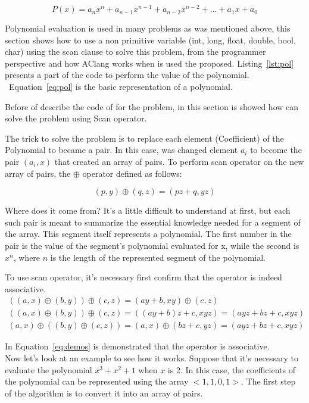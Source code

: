 \documentclass[Ingles]{ic-tese-v1}
\newcommand{\req}[1]{Equation~\ref{eq:#1}}
\newcommand{\rlst}[1]{Listing~\ref{lst:#1}}
\begin{document}
\begin{equation}
P(x) = a_{n}x^n + a_{n-1}x^{n-1} + a_{n-2}x^{n-2} + ... + a_{1}x + a_{0}
\label{eq:pol}
\end{equation}

Polynomial evaluation is used in many problems as was mentioned above, this
section shows how to use a non primitive variable (int, long, float, double, bool, char)
using the scan clause to solve this problem, from the programmer perspective
and how AClang works when is used the proposed. \rlst{pol} presents 
a part of the code to perform the value of the polynomial. ~\req{pol} is the basic
representation of a polynomial.

Before of describe the code of for the problem, in this section is
showed how can solve the problem using Scan operator.

The trick to solve the problem is to replace each element (Coefficient) of the Polynomial to became a pair. In this case, was changed element $a_{i}$ to become the pair $(a_{i}, x)$ that
created an array of pairs. To perform scan operator on the new array of pairs, the $\oplus$ operator defined as follows:

\begin{equation}
(p, y) \oplus (q, z) = (p z + q, y z)
\label{eq:opepol}
\end{equation}

Where does it come from? It's a little difficult to understand at first, but
each such pair is meant to summarize the essential knowledge needed for a
segment of the array. This segment itself represents a polynomial. The first
number in the pair is the value of the segment's polynomial evaluated for x,
while the second is $x^{n}$, where $n$ is the length of the represented segment 
of the polynomial.

To use scan operator, it's necessary first confirm that the operator is indeed associative.
\begin{equation}
\begin{split}
((a, x) \oplus (b, y)) \oplus (c, z) = (a y + b, x y) \oplus (c, z) \\
((a, x) \oplus (b, y)) \oplus (c, z) = ((a y + b) z + c, x y z) = (a y z + b z + c, x y z)\\
(a, x) \oplus ((b, y) \oplus (c, z)) = (a, x) \oplus (b z + c, y z) = (a y z + b z + c, x y z)
\end{split}
\label{eq:demos}
\end{equation}

In \req{demos} is demonstrated that the operator is associative. \\
Now let's look at an example to see how it works. Suppose that it's necessary to evaluate the
polynomial $x^{3} + x^{2} + 1$ when $x$ is 2. In this case, the coefficients of the
polynomial can be represented using the array $<1, 1, 0, 1>$. The first step of the
algorithm is to convert it into an array of pairs.
\end{document}
